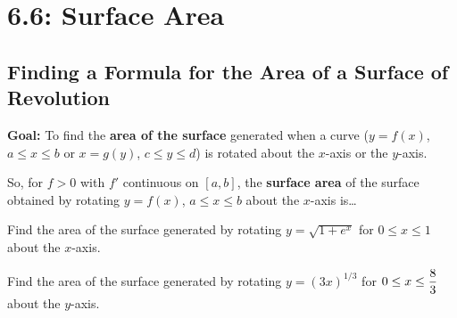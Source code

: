 \documentclass[12pt]{article}
\begin{document}
\section*{6.6: Surface Area}


\vspace{5mm}

\subsection*{Finding a Formula for the Area of a Surface of Revolution}

\textbf{Goal:} To find the \textbf{area of the surface} generated when a curve ($y=f(x)$, $a\leq x\leq b$ or $x=g(y)$, $c\leq y\leq d$) is rotated about the $x$-axis or the $y$-axis.

\vspace{115mm}

So, for $f>0$ with $f'$ continuous on $[a,b]$, the \textbf{surface area} of the surface obtained by rotating $y=f(x)$, $a\leq x\leq b$ about the $x$-axis is\dots

\newpage

\Example Find the area of the surface generated by rotating $y=\sqrt{1+e^x}$ for $0\leq x\leq 1$ about the $x$-axis.

\newpage

\Example Find the area of the surface generated by rotating $y=\left(3x\right)^{1/3}$ for $0\leq x \leq\displaystyle\frac{8}{3}$ about the $y$-axis.
\end{document}
